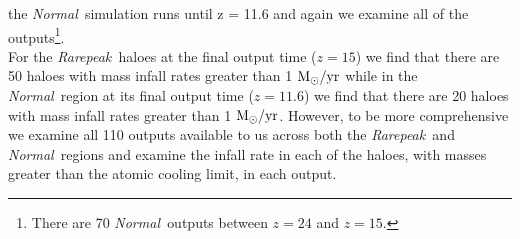 \documentclass[graphics, twocolumn, usenatbib]{mn2e}
\newcommand{\msolaryr} {$\rm{M_{\odot}/yr}~$}
\newcommand{\msolaryrc} {$\rm{M_{\odot}/yr}$}
\newcommand{\rarepeak} {\textit{Rarepeak~}}
\newcommand{\normal} {\textit{Normal~}}
\begin{document}
the \normal simulation runs until z = 11.6 and again we examine all of the
outputs\footnote{There are 70 \normal outputs between $z = 24$ and $z = 15$.}.\\
\indent For the \rarepeak haloes at the final output time ($z = 15$) we find that there are
50 haloes with mass infall rates greater than 1 \msolaryr while in the \normal region at its final
output time ($z = 11.6$) we find that there are 20 haloes with mass infall rates
greater than 1 \msolaryrc. However, to be more comprehensive we examine all 110 outputs available to
us across both the \rarepeak and \normal regions and examine the infall rate in each of the haloes,
with masses greater than the atomic cooling limit, in each output. \\
\end{document}
